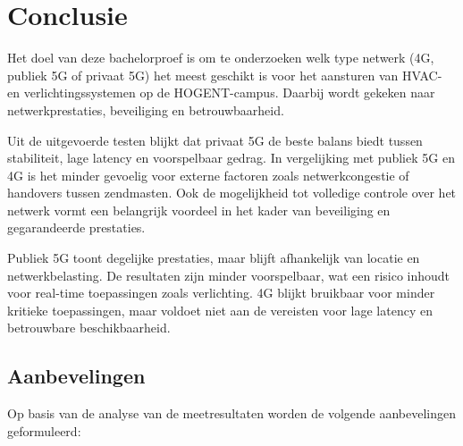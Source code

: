 
\chapter{Conclusie}%
\label{ch:conclusie}



Het doel van deze bachelorproef is om te onderzoeken welk type netwerk (4G, publiek 5G of privaat 5G) het meest geschikt is voor het aansturen van HVAC- en verlichtingssystemen op de HOGENT-campus. Daarbij wordt gekeken naar netwerkprestaties, beveiliging en betrouwbaarheid.

Uit de uitgevoerde testen blijkt dat privaat 5G de beste balans biedt tussen stabiliteit, lage latency en voorspelbaar gedrag. In vergelijking met publiek 5G en 4G is het minder gevoelig voor externe factoren zoals netwerkcongestie of handovers tussen zendmasten. Ook de mogelijkheid tot volledige controle over het netwerk vormt een belangrijk voordeel in het kader van beveiliging en gegarandeerde prestaties.

Publiek 5G toont degelijke prestaties, maar blijft afhankelijk van locatie en netwerkbelasting. De resultaten zijn minder voorspelbaar, wat een risico inhoudt voor real-time toepassingen zoals verlichting. 4G blijkt bruikbaar voor minder kritieke toepassingen, maar voldoet niet aan de vereisten voor lage latency en betrouwbare beschikbaarheid.

\section{Aanbevelingen}

Op basis van de analyse van de meetresultaten worden de volgende aanbevelingen geformuleerd:


